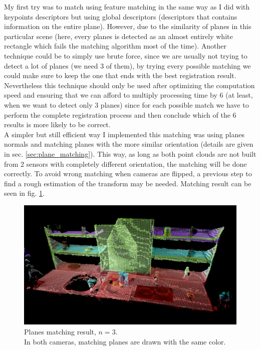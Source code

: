 My first try was to match using feature matching in the same way as I did with keypoints descriptors but using global descriptors (descriptors that contains information on the entire plane). However, due to the similarity of planes in this particular scene (here, every planes is detected as an almost entirely white rectangle which fails the matching algorithm most of the time). Another technique could be to simply use brute force, since we are usually not trying to detect a lot of planes (we need 3 of them), by trying every possible matching we could make sure to keep the one that ends with the best registration result. Nevertheless this technique should only be used after optimizing the computation speed and ensuring that we can afford to multiply processing time by 6 (at least, when we want to detect only 3 planes) since for each possible match we have to perform the complete registration process and then conclude which of the 6 results is more likely to be correct. \\
A simpler but still efficient way I implemented this matching was using planes normals and matching planes with the more similar orientation (details are given in sec. \ref{sec:plane_matching}). This way, as long as both point clouds are not built from 2 sensors with completely different orientation, the matching will be done correctly. To avoid wrong matching when cameras are flipped, a previous step to find a rough estimation of the transform may be needed.
Matching result can be seen in fig. \ref{fig:planes_scene}.

\begin{figure}[h!]
    \centering
    \includegraphics[width=\textwidth]{images/planes_scene.png}
    \caption{Planes matching result, $n=3$.\\In both cameras, matching planes are drawn with the same color.}
    \label{fig:planes_scene}
\end{figure}


